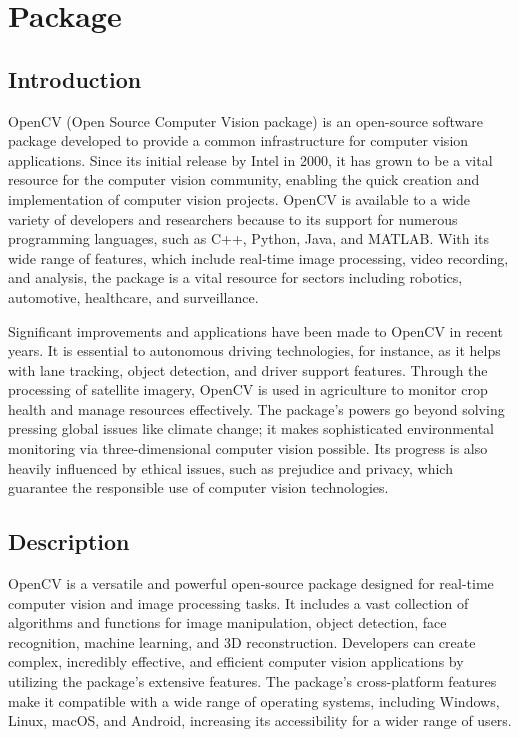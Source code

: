 %
%


\chapter{Package }

\section{Introduction}

OpenCV (Open Source Computer Vision package) is an open-source software package developed to provide a common infrastructure for computer vision applications. Since its initial release by Intel in 2000, it has grown to be a vital resource for the computer vision community, enabling the quick creation and implementation of computer vision projects. OpenCV is available to a wide variety of developers and researchers because to its support for numerous programming languages, such as C++, Python, Java, and MATLAB. With its wide range of features, which include real-time image processing, video recording, and analysis, the package is a vital resource for sectors including robotics, automotive, healthcare, and surveillance.

Significant improvements and applications have been made to OpenCV in recent years. It is essential to autonomous driving technologies, for instance, as it helps with lane tracking, object detection, and driver support features. Through the processing of satellite imagery, OpenCV is used in agriculture to monitor crop health and manage resources effectively. The package's powers go beyond solving pressing global issues like climate change; it makes sophisticated environmental monitoring via three-dimensional computer vision possible. Its progress is also heavily influenced by ethical issues, such as prejudice and privacy, which guarantee the responsible use of computer vision technologies.\cite{OpenCVTeam:2023,OpenCVTeam:2024b}

\section{Description}

OpenCV is a versatile and powerful open-source package designed for real-time computer vision and image processing tasks. It includes a vast collection of algorithms and functions for image manipulation, object detection, face recognition, machine learning, and 3D reconstruction. Developers can create complex, incredibly effective, and efficient computer vision applications by utilizing the package's extensive features. The package's cross-platform features make it compatible with a wide range of operating systems, including Windows, Linux, macOS, and Android, increasing its accessibility for a wider range of users.\cite{OpenCVTeam:2024}

